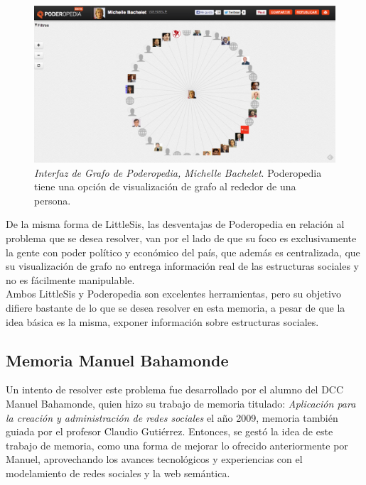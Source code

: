 \begin{figure}[H]
  \includegraphics[width=1.0\textwidth]{images/grafo_poderopedia.png}
  \caption[Interfaz de Grafo de Poderopedia, Michelle Bachelet]{\emph{Interfaz de Grafo de Poderopedia, Michelle Bachelet}. Poderopedia tiene una opción de visualización de grafo al rededor de una persona.}
  \label{ejemplo_grafo_poderopedia}
\end{figure}

De la misma forma de LittleSis, las desventajas de Poderopedia en relación al problema que se desea resolver, van por el lado de que su foco es exclusivamente la gente con poder político y económico del país, que además es centralizada, que su visualización de grafo no entrega información real de las estructuras sociales y no es fácilmente manipulable.\\

Ambos LittleSis y Poderopedia son excelentes herramientas, pero su objetivo difiere bastante de lo que se desea resolver en esta memoria, a pesar de que la idea básica es la misma, exponer información sobre estructuras sociales.


\subsection{Memoria Manuel Bahamonde} %
\label{sub:memoria_manuel_bahamonde}


Un intento de resolver este problema fue desarrollado por el alumno del DCC Manuel Bahamonde, quien hizo su trabajo de memoria titulado: \emph{Aplicación para la creación y administración de redes sociales} \cite{memoriamanuel} el año 2009, memoria también guiada por el profesor Claudio Gutiérrez. Entonces, se gestó la idea de este trabajo de memoria, como una forma de mejorar lo ofrecido anteriormente por Manuel, aprovechando los avances tecnológicos y experiencias con el modelamiento de redes sociales y la web semántica.\\

